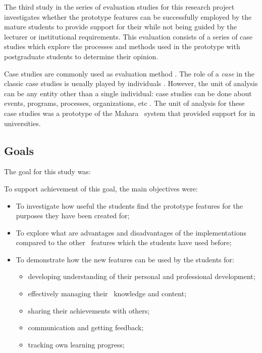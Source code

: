 The third study in the series of evaluation studies for this research project
investigates whether the prototype features can be successfully employed by the
mature students to provide support for their \LLLs while not being guided by the
lecturer or institutional requirements. This evaluation consists of a series of
case studies which explore the processes and methods used in the prototype with
postgraduate students to determine their opinion.

Case studies are commonly used as evaluation method \citep{Yin2012}. The role of
a \textit{case} in the classic case studies is usually played by individuals
\citep{Yin2009}. However, the unit of analysis can be any entity other than a
single individual: case studies can be done about events, programs, processes,
organizations, etc \citep{Yin2009,Patton2002}. The unit of analysis for these
case studies was a prototype of the Mahara \ep~system that provided support for
\LLLs in universities.

\subsection{Goals}

The goal for this study was:


To support achievement of this goal, the main objectives were:

\begin{itemize}
  \item To investigate how useful the students find the prototype features for
  the purposes they have been created for;
  \item To explore what are advantages and disadvantages of the implementations
  compared to the other \ep~features which the students have used before;
  \item To demonstrate how the new features can be used by the students for:
  \begin{itemize}
    \item developing understanding of their personal and professional 
    development;
    \item effectively managing their \ep~knowledge and content;
    \item sharing their achievements with others;
    \item communication and getting feedback;
    \item tracking own learning progress; 
  \end{itemize}
\end{itemize}

